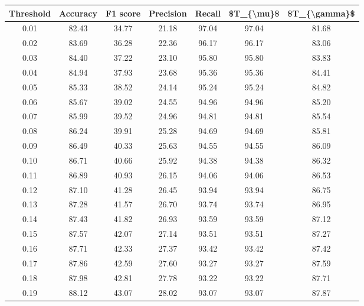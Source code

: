 \begin{tabular}{|c|c|c|c|c|c|c|}
\hline
 Threshold &  Accuracy &  F1 score &  Precision &  Recall &  \$T\_\{\textbackslash mu\}\$ &  \$T\_\{\textbackslash gamma\}\$ \\
\hline
      0.01 &     82.43 &     34.77 &      21.18 &   97.04 &      97.04 &         81.68 \\
      0.02 &     83.69 &     36.28 &      22.36 &   96.17 &      96.17 &         83.06 \\
      0.03 &     84.40 &     37.22 &      23.10 &   95.80 &      95.80 &         83.83 \\
      0.04 &     84.94 &     37.93 &      23.68 &   95.36 &      95.36 &         84.41 \\
      0.05 &     85.33 &     38.52 &      24.14 &   95.24 &      95.24 &         84.82 \\
      0.06 &     85.67 &     39.02 &      24.55 &   94.96 &      94.96 &         85.20 \\
      0.07 &     85.99 &     39.52 &      24.96 &   94.81 &      94.81 &         85.54 \\
      0.08 &     86.24 &     39.91 &      25.28 &   94.69 &      94.69 &         85.81 \\
      0.09 &     86.49 &     40.33 &      25.63 &   94.55 &      94.55 &         86.09 \\
      0.10 &     86.71 &     40.66 &      25.92 &   94.38 &      94.38 &         86.32 \\
      0.11 &     86.89 &     40.93 &      26.15 &   94.06 &      94.06 &         86.53 \\
      0.12 &     87.10 &     41.28 &      26.45 &   93.94 &      93.94 &         86.75 \\
      0.13 &     87.28 &     41.57 &      26.70 &   93.74 &      93.74 &         86.95 \\
      0.14 &     87.43 &     41.82 &      26.93 &   93.59 &      93.59 &         87.12 \\
      0.15 &     87.57 &     42.07 &      27.14 &   93.51 &      93.51 &         87.27 \\
      0.16 &     87.71 &     42.33 &      27.37 &   93.42 &      93.42 &         87.42 \\
      0.17 &     87.86 &     42.59 &      27.60 &   93.27 &      93.27 &         87.59 \\
      0.18 &     87.98 &     42.81 &      27.78 &   93.22 &      93.22 &         87.71 \\
      0.19 &     88.12 &     43.07 &      28.02 &   93.07 &      93.07 &         87.87 \\

\end{tabular}
